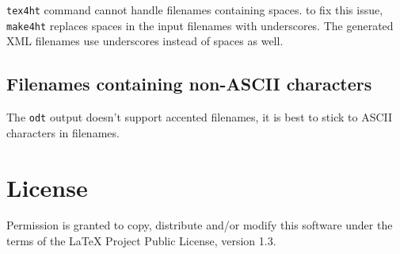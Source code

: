 \texttt{tex4ht} command cannot handle filenames containing spaces. to
fix this issue, \texttt{make4ht} replaces spaces in the input filenames
with underscores. The generated XML filenames use underscores instead of
spaces as well.

\hypertarget{filenames-containing-non-ascii-characters}{%
\subsection{Filenames containing non-ASCII
characters}\label{filenames-containing-non-ascii-characters}}

The \texttt{odt} output doesn't support accented filenames, it is best
to stick to ASCII characters in filenames.

\hypertarget{license}{%
\section{License}\label{license}}

Permission is granted to copy, distribute and/or modify this software
under the terms of the LaTeX Project Public License, version 1.3.
